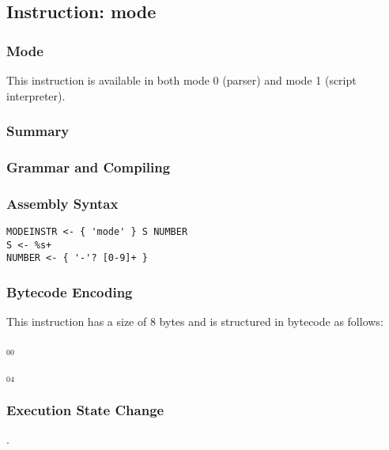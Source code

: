 \subsection{Instruction: mode}

\subsubsection{Mode}
This instruction is available in both mode 0 (parser) and mode 1 (script interpreter).
\subsubsection{Summary}


\subsubsection{Grammar and Compiling}


\subsubsection{Assembly Syntax}

\begin{myquote}
\begin{verbatim}
MODEINSTR <- { 'mode' } S NUMBER
S <- %s+
NUMBER <- { '-'? [0-9]+ }
\end{verbatim}
\end{myquote}

\subsubsection{Bytecode Encoding}

This instruction has a size of 8 bytes and is structured in bytecode as follows:

$_{00}$\ 



$_{04}$\ 

\subsubsection{Execution State Change}

.


